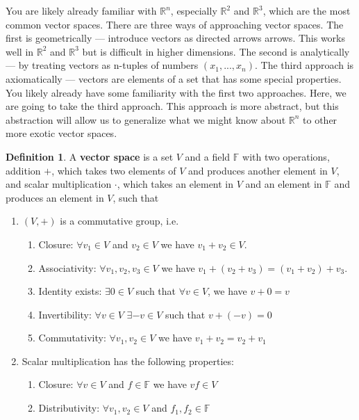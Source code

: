 \documentclass[12pt,reqno]{amsart}
\def\F{\mathbb{F}}
\def\R{\mathbb{R}}
\theoremstyle{definition}
\newtheorem{definition}{Definition}[section]
\begin{document}
You are likely already familiar with $\R^n$, especially $\R^2$ and
$\R^3$, which are the most common vector spaces. There are three ways of
approaching vector spaces. The first is geometrically --- introduce
vectors as directed arrows arrows. This works well in $\R^2$ and
$\R^3$ but is difficult in higher dimensions.  The second is
analytically --- by treating vectors as n-tuples of numbers $(x_1,
..., x_n)$. The third approach is axiomatically --- vectors are
elements of a set that has some special properties. You likely already
have some familiarity with the first two approaches. Here, we are
going to take the third approach. This approach is more abstract, but
this abstraction will allow us to generalize what we might know about
$\R^n$ to other more exotic vector spaces. 

\begin{definition}
  A \textbf{vector space} is a set $V$ and a field $\mathbb{F}$ with
  two operations, addition $+$, which takes two elements of $V$ and
  produces another element in $V$, and scalar multiplication $\cdot$,
  which takes an element in $V$ and an element in $\mathbb{F}$ and
  produces an element in $V$, such that
  \begin{enumerate}
  \item $(V, +)$ is a commutative group, i.e.
    \begin{enumerate}
    \item Closure: $\forall v_1 \in V$ and $v_2 \in V$ we have $v_1
      + v_2 \in V$. 
    \item Associativity: $\forall v_1, v_2, v_3 \in V$ we have $v_1
      + (v_2 + v_3 ) = (v_1 + v_2) + v_3 $. 
    \item Identity exists: $\exists 0 \in V$ such that $\forall v \in
      V$, we have $v + 0 = v$
    \item Invertibility: $\forall v \in V$ $\exists -v \in V$ such
      that $v + (-v) = 0$
    \item Commutativity: $\forall v_1, v_2 \in V$ we have $v_1+v_2 =
      v_2 + v_1$
    \end{enumerate}
  \item Scalar multiplication has the following properties:
    \begin{enumerate}
    \item Closure: $\forall v \in V$ and $f \in \F$ we have $vf \in V$
    \item Distributivity: $\forall v_1 , v_2 \in V$ and $f_1, f_2 \in
      \F$
      \begin{align*}

\end{align*}
\end{enumerate}
\end{enumerate}
\end{definition}
\end{document}
